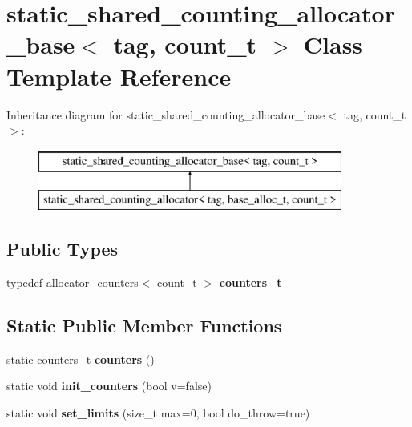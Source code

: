 \hypertarget{classstatic__shared__counting__allocator__base}{}\section{static\+\_\+shared\+\_\+counting\+\_\+allocator\+\_\+base$<$ tag, count\+\_\+t $>$ Class Template Reference}
\label{classstatic__shared__counting__allocator__base}
Inheritance diagram for static\+\_\+shared\+\_\+counting\+\_\+allocator\+\_\+base$<$ tag, count\+\_\+t $>$\+:\begin{figure}[H]
\begin{center}
\leavevmode
\includegraphics[height=2.000000cm]{classstatic__shared__counting__allocator__base}
\end{center}
\end{figure}
\subsection*{Public Types}
\begin{DoxyCompactItemize}
\item 
\hypertarget{classstatic__shared__counting__allocator__base_a7d3b3c16d7e78a70bc5bea127151d51f}{}typedef \hyperlink{structallocator__counters}{allocator\+\_\+counters}$<$ count\+\_\+t $>$ {\bfseries counters\+\_\+t}\label{classstatic__shared__counting__allocator__base_a7d3b3c16d7e78a70bc5bea127151d51f}

\end{DoxyCompactItemize}
\subsection*{Static Public Member Functions}
\begin{DoxyCompactItemize}
\item 
\hypertarget{classstatic__shared__counting__allocator__base_a6d04eeabc836c1715e5f6a360c8905e6}{}static \hyperlink{structallocator__counters}{counters\+\_\+t} {\bfseries counters} ()\label{classstatic__shared__counting__allocator__base_a6d04eeabc836c1715e5f6a360c8905e6}

\item 
\hypertarget{classstatic__shared__counting__allocator__base_a408bd8040dcd351865d06e90e5352ada}{}static void {\bfseries init\+\_\+counters} (bool v=false)\label{classstatic__shared__counting__allocator__base_a408bd8040dcd351865d06e90e5352ada}

\item 
\hypertarget{classstatic__shared__counting__allocator__base_a2a4a64e898b89cb126f80a64449dc81a}{}static void {\bfseries set\+\_\+limits} (size\+\_\+t max=0, bool do\+\_\+throw=true)\label{classstatic__shared__counting__allocator__base_a2a4a64e898b89cb126f80a64449dc81a}

\end{DoxyCompactItemize}
